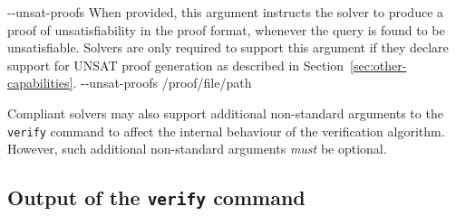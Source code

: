 \clOption
{-{}-unsat-proofs}
{When provided, this argument instructs the solver to produce a proof of unsatisfiability in the \vnnlib{} proof format, whenever the query is found to be unsatisfiable. Solvers are only required to support this argument if they declare support for UNSAT proof generation as described in Section~\ref{sec:other-capabilities}.} { -{}-unsat-proofs /proof/file/path}

\noindent Compliant solvers may also support additional non-standard arguments to the \texttt{verify} command to affect the internal behaviour of the verification algorithm. However, such additional non-standard arguments \textit{must} be optional.

\subsection{Output of the \texttt{verify} command}
\label{sec:verify-output-format}

